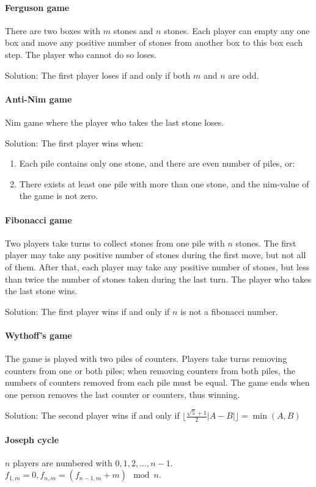 \paragraph{Ferguson game}
There are two boxes with $m$ stones and $n$ stones. Each player can empty any one box and move any positive number of stones from another box to this box each step. The player who cannot do so loses.

Solution: The first player loses if and only if both $m$ and $n$ are odd.

\paragraph{Anti-Nim game}
Nim game where the player who takes the last stone loses.

Solution: The first player wins when:
\begin{enumerate}
\item Each pile contains only one stone, and there are even number of piles, or:
\item There exists at least one pile with more than one stone, and the nim-value of the game is not zero.
\end{enumerate}

\paragraph{Fibonacci game}
Two players take turns to collect stones from one pile with $n$ stones. The first player may take any positive number of stones during the first move, but not all of them. After that, each player may take any positive number of stones, but less than twice the number of stones taken during the last turn. The player who takes the last stone wins.

Solution: The first player wins if and only if $n$ is not a fibonacci number.

\paragraph{Wythoff's game}
The game is played with two piles of counters. Players take turns removing counters from one or both piles; when removing counters from both piles, the numbers of counters removed from each pile must be equal. The game ends when one person removes the last counter or counters, thus winning.

Solution: The second player wins if and only if $\lfloor \frac{\sqrt{5}+1}{2}|A-B| \rfloor=\min(A,B)$

\paragraph{Joseph cycle}
$n$ players are numbered with $0,1,2,...,n-1$. $f_{1,m}=0,f_{n,m}=(f_{n-1,m}+m)\mod n$.
